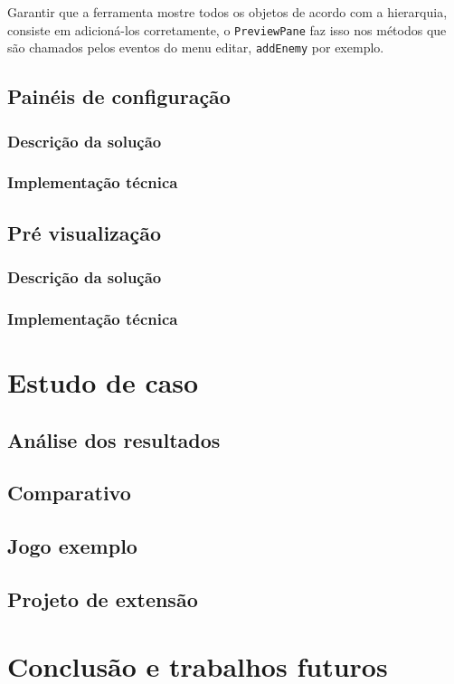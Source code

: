 \documentclass[12pt,twoside,openright,a4paper,english,brazil,sumario=tradicional]{abntex2}
\begin{document}
Garantir que a ferramenta mostre todos os objetos de acordo com a hierarquia, consiste em adicioná-los corretamente, o \texttt{PreviewPane} faz isso nos métodos que são chamados pelos eventos do menu editar, \texttt{addEnemy} por exemplo.

\section{Painéis de configuração}

\subsection{Descrição da solução}
\subsection{Implementação técnica}

\section{Pré visualização}

\subsection{Descrição da solução}
\subsection{Implementação técnica}

\chapter{Estudo de caso}
\label{chap:caso}
\section{Análise dos resultados}
\section{Comparativo}
\section{Jogo exemplo}
\section{Projeto de extensão}

\chapter{Conclusão e trabalhos futuros}
\label{chap:conclcsao}
\end{document}
